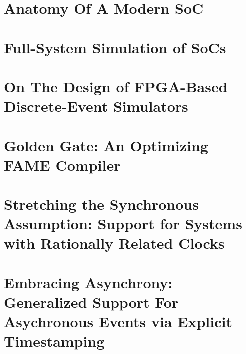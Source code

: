 \documentclass[phd]{ucbthesis}
\begin{document}
%

\chapter{Anatomy Of A Modern SoC}



\chapter{Full-System Simulation of SoCs}



\chapter{On The Design of FPGA-Based Discrete-Event Simulators}\label{ch:fpga-des}



\chapter{Golden Gate: An Optimizing FAME Compiler}\label{sec:golden-gate}



\chapter{Stretching the Synchronous Assumption: Support for Systems with Rationally Related Clocks}\label{sec:static-multiclock}

\chapter{Embracing Asynchrony: Generalized Support For Asychronous Events via Explicit Timestamping}\label{sec:dynamic-multiclock}

%

\printbibliography
\end{document}
